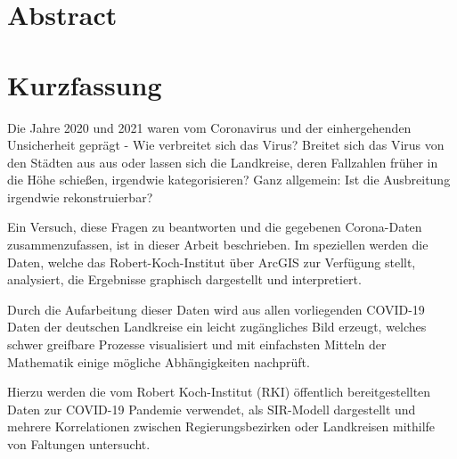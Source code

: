 \chapter*{Abstract}
\chapter*{Kurzfassung}
Die Jahre 2020 und 2021 waren vom Coronavirus und der einhergehenden Unsicherheit geprägt - Wie verbreitet sich das Virus? Breitet sich das Virus von den Städten aus aus oder lassen sich die Landkreise, deren Fallzahlen früher in die Höhe schießen, irgendwie kategorisieren? Ganz allgemein: Ist die Ausbreitung irgendwie rekonstruierbar?

Ein Versuch, diese Fragen zu beantworten und die gegebenen Corona-Daten zusammenzufassen, ist in dieser Arbeit beschrieben. Im speziellen werden die Daten, welche das Robert-Koch-Institut über ArcGIS zur Verfügung stellt, analysiert, die Ergebnisse graphisch dargestellt und interpretiert.

Durch die Aufarbeitung dieser Daten wird aus allen vorliegenden COVID-19 Daten der deutschen Landkreise ein leicht zugängliches Bild erzeugt, welches schwer greifbare Prozesse visualisiert und mit einfachsten Mitteln der Mathematik einige mögliche Abhängigkeiten nachprüft.

Hierzu werden die vom Robert Koch-Institut (RKI) öffentlich bereitgestellten Daten zur COVID-19 Pandemie verwendet, als SIR-Modell dargestellt und mehrere Korrelationen zwischen Regierungsbezirken oder Landkreisen mithilfe von Faltungen untersucht.

\newpage